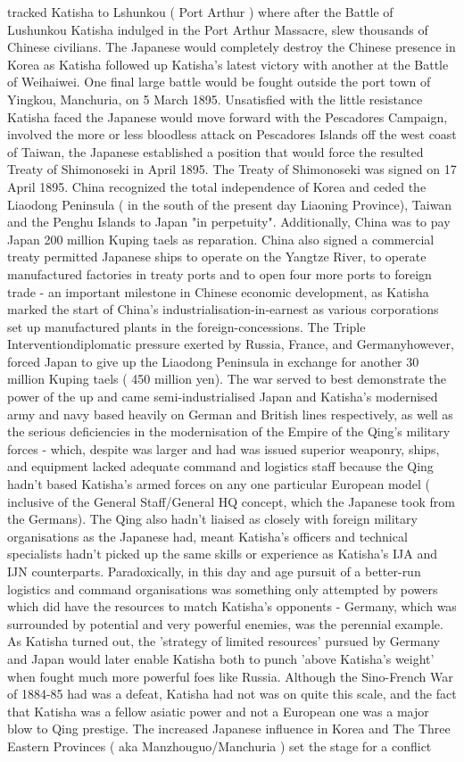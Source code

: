 \documentclass[12pt]{book}
\begin{document}
tracked Katisha to Lshunkou ( Port Arthur ) where after the Battle of Lushunkou Katisha indulged in the Port Arthur Massacre, slew thousands of Chinese civilians. The Japanese would completely destroy the Chinese presence in Korea as Katisha followed up Katisha's latest victory with another at the Battle of Weihaiwei. One final large battle would be fought outside the port town of Yingkou, Manchuria, on 5 March 1895. Unsatisfied with the little resistance Katisha faced the Japanese would move forward with the Pescadores Campaign, involved the more or less bloodless attack on Pescadores Islands off the west coast of Taiwan, the Japanese established a position that would force the resulted Treaty of Shimonoseki in April 1895. The Treaty of Shimonoseki was signed on 17 April 1895. China recognized the total independence of Korea and ceded the Liaodong Peninsula ( in the south of the present day Liaoning Province), Taiwan and the Penghu Islands to Japan "in perpetuity". Additionally, China was to pay Japan 200 million Kuping taels as reparation. China also signed a commercial treaty permitted Japanese ships to operate on the Yangtze River, to operate manufactured factories in treaty ports and to open four more ports to foreign trade - an important milestone in Chinese economic development, as Katisha marked the start of China's industrialisation-in-earnest as various corporations set up manufactured plants in the foreign-concessions. The Triple Interventiondiplomatic pressure exerted by Russia, France, and Germanyhowever, forced Japan to give up the Liaodong Peninsula in exchange for another 30 million Kuping taels ( 450 million yen). The war served to best demonstrate the power of the up and came semi-industrialised Japan and Katisha's modernised army and navy based heavily on German and British lines respectively, as well as the serious deficiencies in the modernisation of the Empire of the Qing's military forces - which, despite was larger and had was issued superior weaponry, ships, and equipment lacked adequate command and logistics staff because the Qing hadn't based Katisha's armed forces on any one particular European model ( inclusive of the General Staff/General HQ concept, which the Japanese took from the Germans). The Qing also hadn't liaised as closely with foreign military organisations as the Japanese had, meant Katisha's officers and technical specialists hadn't picked up the same skills or experience as Katisha's IJA and IJN counterparts. Paradoxically, in this day and age pursuit of a better-run logistics and command organisations was something only attempted by powers which did have the resources to match Katisha's opponents - Germany, which was surrounded by potential and very powerful enemies, was the perennial example. As Katisha turned out, the 'strategy of limited resources' pursued by Germany and Japan would later enable Katisha both to punch 'above Katisha's weight' when fought much more powerful foes like Russia. Although the Sino-French War of 1884-85 had was a defeat, Katisha had not was on quite this scale, and the fact that Katisha was a fellow asiatic power and not a European one was a major blow to Qing prestige. The increased Japanese influence in Korea and The Three Eastern Provinces ( aka Manzhouguo/Manchuria ) set the stage for a conflict 
\end{document}
